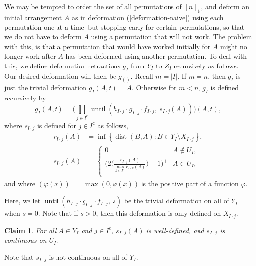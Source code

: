 \documentclass[11pt]{article}
\numberwithin{equation}{section}
\newtheorem{claim}[theorem]{Claim}
\theoremstyle{remark}
\let\mb\mathbb
\let\phi\varphi
\newcommand{\compl}[1]{{{#1}^{\text{c}}}}
\DeclareMathOperator{\dist}{dist}
\DeclareMathOperator{\upto}{until}
\begin{document}
We may be tempted to order the set of all permutations of $[n]_\mb{N}$, and deform an initial arrangement $A$ as in deformation (\ref{deformation-naive}) using each permutation one at a time, but stopping early for certain permutations, so that we do not have to deform $A$ using a permutation that will not work. The problem with this, is that a permutation that would have worked initially for $A$ might no longer work after $A$ has been deformed using another permutation. To deal with this, we define deformation retractions $g_I$ from $Y_I$ to $Z_I$ recursively as follows. Our desired deformation will then be $g_{()}$.
Recall $m=|I|$.
If $m=n$, then $g_I$ is just the trivial deformation $g_I({A},t) = {A}$.
Otherwise for $m<n$, $g_I$ is defined recursively by
\begin{equation}\label{equation-g}
g_{I}({A},t) = \biggl( \prod_{j \in \compl{I} } \upto\left(h_{I \cdot j} \cdot g_{I \cdot j} \cdot f_{I \cdot j},\ s_{I \cdot j} ({A}) \right)\biggr) ({A},t),
\end{equation}
where $s_{I \cdot j}$ is defined for $j \in \compl{I}$ as follows,
\begin{align*}
r_{I\cdot j}(A) &= \inf \left\{\dist(B,A): B \in Y_{I} \setminus X_{I\cdot j} \right\},\\
s_{I \cdot j}(A) &= \begin{cases}
0 & A \not\in U_{I}, \\
\biggl(2\biggl(\frac{\displaystyle r_{I\cdot j}({A})}{\displaystyle \max_{k \in \compl{I}} r_{I\cdot k}({A}) }\biggr) -1 \biggr)^+ & A \in U_{I}, \\
\end{cases}
\end{align*}
and where $(\phi(x))^+ = \max(0,\phi(x))$ is the positive part of a function $\phi$.

Here, we let $\upto\left(h_{I \cdot j} \cdot g_{I \cdot j} \cdot f_{I \cdot j},\ s \right)$ be the trivial deformation on all of $Y_I$ when $s=0$. Note that if $s > 0$, then this deformation is only defined on $X_{I\cdot j}$.

\begin{claim}\label{claim-s}
For all $A \in Y_I$ and $j \in \compl{I}$, $s_{I\cdot j}(A)$ is well-defined, and $s_{I\cdot j}$ is continuous on $U_{I}$.
\end{claim}

Note that $s_{I\cdot j}$ is not continuous on all of $Y_I$.
\end{document}
